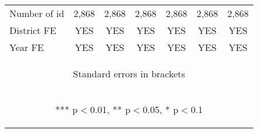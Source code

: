 \begin{center}
\begin{tabular}{lcccccc}
Number of id & 2,868 & 2,868 & 2,868 & 2,868 & 2,868 & 2,868 \\
District FE & YES & YES & YES & YES & YES & YES \\
 Year FE & YES & YES & YES & YES & YES & YES \\ \hline
\multicolumn{7}{c}{\begin{footnotesize} Standard errors in brackets\end{footnotesize}} \\
\multicolumn{7}{c}{\begin{footnotesize} *** p$<$0.01, ** p$<$0.05, * p$<$0.1\end{footnotesize}} \\
\end{tabular}
\end{center}
